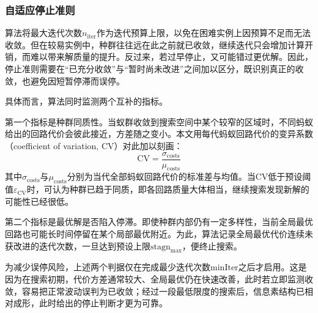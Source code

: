 \documentclass[lettersize,journal]{IEEEtran}
\begin{document}
\subsubsection{自适应停止准则}
算法将最大迭代次数$n_{\mathrm{iter}}$作为迭代预算上限，以免在困难实例上因预算不足而无法收敛。但在较易实例中，种群往往远在此之前就已收敛，继续迭代只会增加计算开销，而难以带来解质量的提升。反过来，若过早停止，又可能错过更优解。因此，停止准则需要在“已充分收敛”与“暂时尚未改进”之间加以区分，既识别真正的收敛，也避免因短暂停滞而误停。

具体而言，算法同时监测两个互补的指标。

第一个指标是种群同质性。当蚁群收敛到搜索空间中某个较窄的区域时，不同蚂蚁给出的回路代价会彼此接近，方差随之变小。本文用每代蚂蚁回路代价的变异系数（coefficient of variation, CV）对此加以刻画：
\begin{equation}
\mathrm{CV} = \frac{\sigma_{\mathrm{costs}}}{\mu_{\mathrm{costs}}}
\label{eq:cv}
\end{equation}
其中$\sigma_{\mathrm{costs}}$与$\mu_{\mathrm{costs}}$分别为当代全部蚂蚁回路代价的标准差与均值。当$\mathrm{CV}$低于预设阈值$\varepsilon_{\mathrm{CV}}$时，可认为种群已趋于同质，即各回路质量大体相当，继续搜索发现新解的可能性已经很低。

第二个指标是最优解是否陷入停滞。即使种群内部仍有一定多样性，当前全局最优回路也可能长时间停留在某个局部最优附近。为此，算法记录全局最优代价连续未获改进的迭代次数，一旦达到预设上限$\mathrm{stagn}_{\max}$，便终止搜索。

为减少误停风险，上述两个判据仅在完成最少迭代次数$\mathrm{minIter}$之后才启用。这是因为在搜索初期，代价方差通常较大、全局最优仍在快速改善，此时若立即监测收敛，容易把正常波动误判为已收敛；经过一段最低限度的搜索后，信息素结构已相对成形，此时给出的停止判断才更为可靠。
\end{document}
